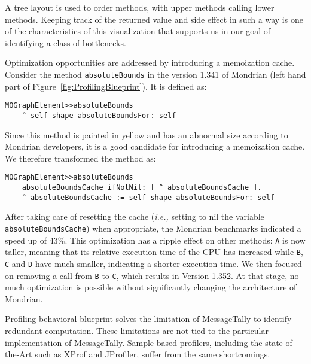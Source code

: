 \documentclass[runningheads]{llncs}
\newcommand{\ct}{\lstinline[backgroundcolor=\color{white},basicstyle=\footnotesize\ttfamily]}
\newcommand{\ie}{\emph{i.e.,}\xspace}
\newcommand{\figref}[1]{Figure~\ref{fig:#1}}
\begin{document}
A tree layout is used to order methods, with upper methods calling lower methods.
Keeping track of the returned value and side effect in such a way is one of the characteristics of this visualization that supports us in our goal of identifying a class of bottlenecks. 

Optimization opportunities are addressed by introducing a memoization cache.
Consider the method \ct{absoluteBounds} in the version 1.341 of Mondrian (left hand part of \figref{ProfilingBlueprint}). It is defined as:

\begin{lstlisting}
MOGraphElement>>absoluteBounds
	^ self shape absoluteBoundsFor: self
\end{lstlisting}

Since this method is painted in yellow and has an abnormal size according to Mondrian developers, it is a good candidate for introducing a memoization cache. We therefore transformed the method as:

\begin{lstlisting}
MOGraphElement>>absoluteBounds
	absoluteBoundsCache ifNotNil: [ ^ absoluteBoundsCache ].
	^ absoluteBoundsCache := self shape absoluteBoundsFor: self
\end{lstlisting}

After taking care of resetting the cache (\ie setting to nil the variable \ct{absoluteBoundsCache}) when appropriate, the Mondrian benchmarks indicated a speed up of 43\%. This optimization has a ripple effect on other methods: \ct{A} is now taller, meaning that its relative execution time of the CPU has increased while \ct{B}, \ct{C} and \ct{D} have much smaller, indicating a shorter execution time. We then focused on removing a call from \ct{B} to \ct{C}, which results in Version 1.352. At that stage, no much optimization is possible without significantly changing the architecture of Mondrian.

Profiling behavioral blueprint solves the limitation of MessageTally to identify redundant computation. These limitations are not tied to the particular implementation of MessageTally. Sample-based profilers, including the state-of-the-Art such as XProf and JProfiler, suffer from the same shortcomings. 
\end{document}
